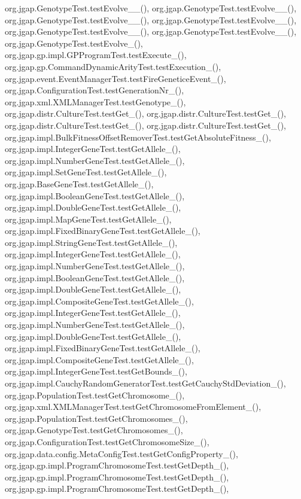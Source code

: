 org.\-jgap.\-Genotype\-Test.\-test\-Evolve\-\_\-\_(), org.\-jgap.\-Genotype\-Test.\-test\-Evolve\-\_\-\_(), org.\-jgap.\-Genotype\-Test.\-test\-Evolve\-\_\-\_(), org.\-jgap.\-Genotype\-Test.\-test\-Evolve\-\_\-\_(), org.\-jgap.\-Genotype\-Test.\-test\-Evolve\-\_\-\_(), org.\-jgap.\-Genotype\-Test.\-test\-Evolve\-\_\-\_(), org.\-jgap.\-Genotype\-Test.\-test\-Evolve\-\_(), org.\-jgap.\-gp.\-impl.\-G\-P\-Program\-Test.\-test\-Execute\-\_(), org.\-jgap.\-gp.\-Command\-Dynamic\-Arity\-Test.\-test\-Execution\-\_(), org.\-jgap.\-event.\-Event\-Manager\-Test.\-test\-Fire\-Genetice\-Event\-\_(), org.\-jgap.\-Configuration\-Test.\-test\-Generation\-Nr\-\_(), org.\-jgap.\-xml.\-X\-M\-L\-Manager\-Test.\-test\-Genotype\-\_(), org.\-jgap.\-distr.\-Culture\-Test.\-test\-Get\-\_(), org.\-jgap.\-distr.\-Culture\-Test.\-test\-Get\-\_(), org.\-jgap.\-distr.\-Culture\-Test.\-test\-Get\-\_(), org.\-jgap.\-distr.\-Culture\-Test.\-test\-Get\-\_(), org.\-jgap.\-impl.\-Bulk\-Fitness\-Offset\-Remover\-Test.\-test\-Get\-Absolute\-Fitness\-\_(), org.\-jgap.\-impl.\-Integer\-Gene\-Test.\-test\-Get\-Allele\-\_(), org.\-jgap.\-impl.\-Number\-Gene\-Test.\-test\-Get\-Allele\-\_(), org.\-jgap.\-impl.\-Set\-Gene\-Test.\-test\-Get\-Allele\-\_(), org.\-jgap.\-Base\-Gene\-Test.\-test\-Get\-Allele\-\_(), org.\-jgap.\-impl.\-Boolean\-Gene\-Test.\-test\-Get\-Allele\-\_(), org.\-jgap.\-impl.\-Double\-Gene\-Test.\-test\-Get\-Allele\-\_(), org.\-jgap.\-impl.\-Map\-Gene\-Test.\-test\-Get\-Allele\-\_(), org.\-jgap.\-impl.\-Fixed\-Binary\-Gene\-Test.\-test\-Get\-Allele\-\_(), org.\-jgap.\-impl.\-String\-Gene\-Test.\-test\-Get\-Allele\-\_(), org.\-jgap.\-impl.\-Integer\-Gene\-Test.\-test\-Get\-Allele\-\_(), org.\-jgap.\-impl.\-Number\-Gene\-Test.\-test\-Get\-Allele\-\_(), org.\-jgap.\-impl.\-Boolean\-Gene\-Test.\-test\-Get\-Allele\-\_(), org.\-jgap.\-impl.\-Double\-Gene\-Test.\-test\-Get\-Allele\-\_(), org.\-jgap.\-impl.\-Composite\-Gene\-Test.\-test\-Get\-Allele\-\_(), org.\-jgap.\-impl.\-Integer\-Gene\-Test.\-test\-Get\-Allele\-\_(), org.\-jgap.\-impl.\-Number\-Gene\-Test.\-test\-Get\-Allele\-\_(), org.\-jgap.\-impl.\-Double\-Gene\-Test.\-test\-Get\-Allele\-\_(), org.\-jgap.\-impl.\-Fixed\-Binary\-Gene\-Test.\-test\-Get\-Allele\-\_(), org.\-jgap.\-impl.\-Composite\-Gene\-Test.\-test\-Get\-Allele\-\_(), org.\-jgap.\-impl.\-Integer\-Gene\-Test.\-test\-Get\-Bounds\-\_(), org.\-jgap.\-impl.\-Cauchy\-Random\-Generator\-Test.\-test\-Get\-Cauchy\-Std\-Deviation\-\_(), org.\-jgap.\-Population\-Test.\-test\-Get\-Chromosome\-\_(), org.\-jgap.\-xml.\-X\-M\-L\-Manager\-Test.\-test\-Get\-Chromosome\-From\-Element\-\_(), org.\-jgap.\-Population\-Test.\-test\-Get\-Chromosomes\-\_(), org.\-jgap.\-Genotype\-Test.\-test\-Get\-Chromosomes\-\_(), org.\-jgap.\-Configuration\-Test.\-test\-Get\-Chromosome\-Size\-\_(), org.\-jgap.\-data.\-config.\-Meta\-Config\-Test.\-test\-Get\-Config\-Property\-\_(), org.\-jgap.\-gp.\-impl.\-Program\-Chromosome\-Test.\-test\-Get\-Depth\-\_(), org.\-jgap.\-gp.\-impl.\-Program\-Chromosome\-Test.\-test\-Get\-Depth\-\_(), org.\-jgap.\-gp.\-impl.\-Program\-Chromosome\-Test.\-test\-Get\-Depth\-\_(), 